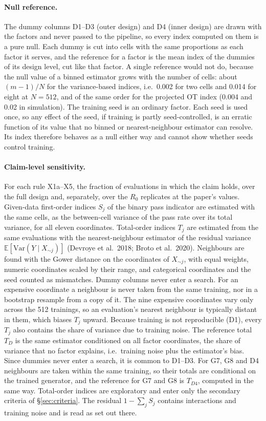 \documentclass[11pt,a4paper]{article}
\begin{document}
\paragraph{Null reference.} The dummy columns D1--D3 (outer design)
and D4 (inner design) are drawn with the factors and never passed to the
pipeline, so every index computed on them is a pure null. Each dummy is
cut into cells with the same proportions as each factor it serves, and the
reference for a factor is the mean index of the dummies of its design
level, cut like that factor. A single reference would not do, because the
null value of a binned estimator grows with the number of cells: about
$(m-1)/N$ for the variance-based indices, i.e.\ 0.002 for two cells and
0.014 for eight at $N=512$, and of the same order for the projected OT
index (0.004 and 0.02 in simulation). The training seed is an ordinary
factor. Each seed is used once, so any effect of the seed, if training is
partly seed-controlled, is an erratic function of its value that no binned
or nearest-neighbour estimator can resolve. Its index therefore behaves as
a null either way and cannot show whether seeds control training.

\paragraph{Claim-level sensitivity.} For each rule X1a--X5, the fraction of
evaluations in which the claim holds, over the full design
and, separately, over the $R_0$ replicates at the paper's values.
Given-data first-order indices $S_j$ of the binary pass indicator are
estimated with the same cells, as the between-cell variance of the pass
rate over its total variance, for all eleven coordinates. Total-order
indices $T_j$ are estimated from the same evaluations with the
nearest-neighbour estimator of the residual variance
$\mathbb{E}[\mathrm{Var}(Y\mid X_{\sim j})]$ (Devroye et al.\ 2018; Broto
et al.\ 2020). Neighbours are found with the Gower distance on the
coordinates of $X_{\sim j}$, with equal weights, numeric coordinates scaled
by their range, and categorical coordinates and the seed counted as
mismatches. Dummy columns never enter a search. For an expensive
coordinate a neighbour is never taken from the same training, nor in a
bootstrap resample from a copy of it. The nine expensive coordinates vary
only across the 512 trainings, so an evaluation's nearest neighbour is
typically distant in them, which biases $T_j$ upward. Because training is
not reproducible (D1), every $T_j$ also contains the share of variance
due to training noise. The reference total $T_D$ is the same estimator
conditioned on all factor coordinates, the share of variance that no
factor explains, i.e.\ training noise plus the estimator's bias. Since
dummies never enter a search, it is common to D1--D3. For G7, G8 and D4
neighbours are taken within the same training, so their totals are
conditional on the trained generator, and the reference for G7 and G8 is
$T_{D4}$, computed in the same way. Total-order indices are exploratory
and enter only the secondary criteria of \S\ref{sec:criteria}. The
residual $1-\sum_j S_j$ contains interactions and training noise and is
read as set out there.
\end{document}
